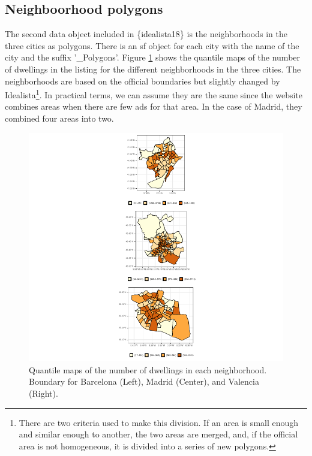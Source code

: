 \documentclass[Royal,times,sageh]{sagej}
\begin{document}
\hypertarget{neighboorhood-polygons}{%
\subsection{Neighboorhood polygons}\label{neighboorhood-polygons}}

The second data object included in \{idealista18\} is the neighborhoods
in the three cities as polygons. There is an sf object for each city
with the name of the city and the suffix '\_Polygons'. Figure
\ref{fig:all-polygons} shows the quantile maps of the number of
dwellings in the listing for the different neighborhoods in the three
cities. The neighborhoods are based on the official boundaries but
slightly changed by
Idealista\footnote{There are two criteria used to make this division. If an area is small enough and similar enough to another, the two areas are merged, and, if the official area is not homogeneous, it is divided into a series of new polygons.}.
In practical terms, we can assume they are the same since the website
combines areas when there are few ads for that area. In the case of
Madrid, they combined four areas into two.

\begin{figure}
\centering
\includegraphics{main_EPB_files/figure-latex/unnamed-chunk-1-1.pdf}
\caption{\label{fig:all-polygons}Quantile maps of the number of
dwellings in each neighborhood. Boundary for Barcelona (Left), Madrid
(Center), and Valencia (Right).}
\end{figure}
\end{document}
